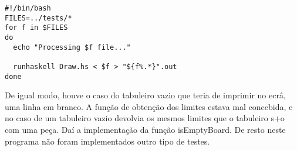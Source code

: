 \begin{verbatim}
#!/bin/bash
FILES=../tests/*
for f in $FILES
do
  echo "Processing $f file..."
 
  runhaskell Draw.hs < $f > "${f%.*}".out
done

\end{verbatim}
De igual modo, houve o caso do tabuleiro vazio que teria de imprimir no ecrâ, uma linha em branco. A função
de obtenção dos limites estava mal concebida, e no caso de um tabuleiro vazio devolvia os mesmos limites que
o tabuleiro s+o com uma peça. Daí a implementação da função isEmptyBoard.
De resto neste programa não foram implementados outro tipo de testes.

 
